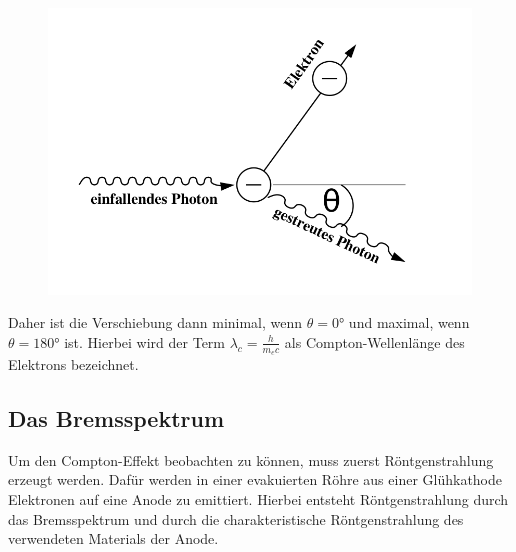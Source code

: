 \begin{figure}[H]
	\centering
	\label{fig:StreuungPhoton}
	\includegraphics[scale=0.3]{content/comptoneffekt.png}
\end{figure}
\noindent
Daher ist die Verschiebung dann minimal, wenn $\theta = 0 \si{\degree}$ und maximal, wenn $\theta = 180 \si{\degree}$ ist.
Hierbei wird der Term $\lambda_c = \frac{h}{m_e c}$ als Compton-Wellenlänge des Elektrons bezeichnet.

\subsection{Das Bremsspektrum}
Um den Compton-Effekt beobachten zu können, muss zuerst Röntgenstrahlung erzeugt werden. Dafür werden in einer evakuierten Röhre aus einer Glühkathode Elektronen auf eine Anode zu emittiert.
Hierbei entsteht Röntgenstrahlung durch das Bremsspektrum und durch die charakteristische Röntgenstrahlung des verwendeten Materials der Anode.
